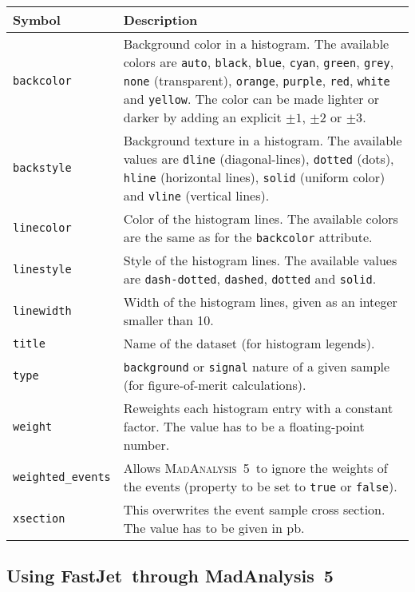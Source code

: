 \documentclass[a4paper]{article}
\newcommand{\MA}{\textsc{MadAnalysis}~5}
\newcommand{\MAnorm}{{MadAnalysis}~5}
\newcommand{\FJnorm}{{FastJet}}
\begin{document}
\begin{center}\begin{tabular}{l p{9.1cm}}
\hline
Symbol& Description\\
\hline
\color{ao} \verb?backcolor? & Background color in a histogram. The available colors are
   \verb?auto?, \verb?black?, \verb?blue?, \verb?cyan?, \verb?green?,
   \verb?grey?, \verb?none? (transparent), \verb?orange?, \verb?purple?,
   \verb?red?, \verb?white? and \verb?yellow?. The color can be made lighter or
    darker by adding an explicit $\pm 1$, $\pm 2$ or $\pm 3$.\\
\color{ao} \verb?backstyle? & Background texture in a histogram. The available values are
   \verb?dline? (diagonal-lines), \verb?dotted? (dots), \verb?hline? (horizontal
   lines), \verb?solid? (uniform color) and \verb?vline? (vertical lines).\\
\color{ao} \verb?linecolor? & Color of the histogram lines. The available colors are the
   same as for the \verb?backcolor? attribute.\\
\color{ao} \verb?linestyle? & Style of the histogram lines. The available values are
   \verb?dash-dotted?, \verb?dashed?, \verb?dotted? and \verb?solid?.\\
\color{ao} \verb?linewidth? & Width of the histogram lines, given as an integer smaller
   than 10.\\
\color{ao} \verb?title?     & Name of the dataset (for histogram legends).\\
\color{ao} \verb?type?      & \verb?background? or \verb?signal? nature of a given sample
  (for figure-of-merit calculations).\\
\color{ao} \verb?weight?    & Reweights each histogram entry with a constant factor. The
  value has to be a floating-point number.\\
\color{ao} \verb?weighted_events? & Allows \MA\ to ignore the weights of the events
  (property to be set to \verb?true? or \verb?false?).\\
\color{ao} \verb?xsection?  & This overwrites the event sample cross section. The value has
  to be given in pb.\\
\hline
\end{tabular}
\end{center}

\vspace{2cm}

\begin{shaded}
\section{\Large Using \FJnorm\ through \MAnorm}
\end{shaded}
\end{document}

